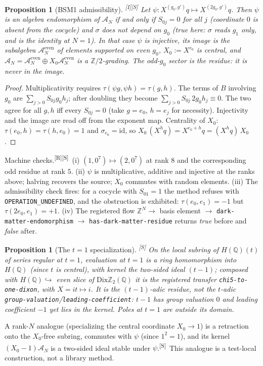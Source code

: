 \documentclass[11pt,a4paper]{article}
\newtheorem{proposition}[theorem]{Proposition}
\theoremstyle{definition}
\theoremstyle{remark}
\newcommand{\Z}{\mathbb{Z}}
\newcommand{\HQ}{H(\mathbb{Q})}
\newcommand{\DZ}{\mathrm{Dix}\mathbb{Z}_2(\mathbb{Q})}
\newcommand{\code}[1]{\texttt{#1}}
\newcommand{\tR}{\textsuperscript{[R]}}
\newcommand{\tS}{\textsuperscript{[S]}}
\newcommand{\tI}{\textsuperscript{[I]}}
\begin{document}
\begin{proposition}[BSM1 admissibility]\label{prop:bsm1}\tI\tS
Let $\psi:X^{(g_0,g')}q\mapsto X^{(2g_0,g')}q$. Then $\psi$ is an algebra endomorphism of $\mathcal{A}_N$ if and only if $S_{0j}=0$ for all $j$ (coordinate $0$ is absent from the cocycle) and $\sigma$ does not depend on $g_0$ (true here: $\sigma$ reads $g_1$ only, and is the identity at $N=1$). In that case $\psi$ is injective, its image is the subalgebra $\mathcal{A}_N^{\mathrm{even}}$ of elements supported on even $g_0$, $X_0:=X^{e_0}$ is central, and $\mathcal{A}_N=\mathcal{A}_N^{\mathrm{even}}\oplus X_0\mathcal{A}_N^{\mathrm{even}}$ is a $\Z/2$-grading. The odd-$g_0$ sector is the \emph{residue}: it is never in the image.
\end{proposition}
\begin{proof}
Multiplicativity requires $\tau(\psi g,\psi h)=\tau(g,h)$. The terms of $B$ involving $g_0$ are $\sum_{j>0}S_{0j}g_0h_j$; after doubling they become $\sum_{j>0}S_{0j}\,2g_0h_j\equiv0$. The two agree for all $g,h$ iff every $S_{0j}=0$ (take $g=e_0$, $h=e_j$ for necessity). Injectivity and the image are read off from the exponent map. Centrality of $X_0$: $\tau(e_0,h)=\tau(h,e_0)=1$ and $\sigma_{e_0}=\mathrm{id}$, so $X_0\,(X^hq)=X^{e_0+h}q=(X^hq)\,X_0$.
\end{proof}
\noindent Machine checks.\tR\tS\ (i) $(1,0^7)\mapsto(2,0^7)$ at rank $8$ and the corresponding odd residue at rank $5$. (ii) $\psi$ is multiplicative, additive and injective at the ranks above; halving recovers the source; $X_0$ commutes with random elements. (iii) The admissibility check fires: for a cocycle with $S_{01}=1$ the method refuses with \code{OPERATION\_UNDEFINED}, and the obstruction is exhibited: $\tau(e_0,e_1)=-1$ but $\tau(2e_0,e_1)=+1$. (iv) The registered flow $\Z^N\to$ basis element $\to$ \code{dark-matter-endomorphism} $\to$ \code{has-dark-matter-residue} returns \emph{true} before and \emph{false} after.

\begin{proposition}[The $t=1$ specialization]\label{prop:t1}\tS
On the local subring of $\HQ(t)$ of series regular at $t=1$, evaluation at $t=1$ is a ring homomorphism into $\HQ$ (since $t$ is central), with kernel the two-sided ideal $(t-1)$; composed with $\HQ\hookrightarrow$ even slice of $\DZ$ it is the registered transfer \code{chi5-to-one-dixon}, with $X=it\mapsto i$. It is the $(t-1)$-adic residue, \emph{not} the $t$-adic \code{group-valuation}/\code{leading-coefficient}: $t-1$ has group valuation $0$ and leading coefficient $-1$ yet lies in the kernel. Poles at $t=1$ are outside its domain.
\end{proposition}
\noindent A rank-$N$ analogue (specializing the central coordinate $X_0\to1$) is a retraction onto the $X_0$-free subring, commutes with $\psi$ (since $1^2=1$), and its kernel $(X_0-1)\mathcal{A}_N$ is a two-sided ideal stable under $\psi$.\tS\ This analogue is a test-local construction, not a library method.
\end{document}

